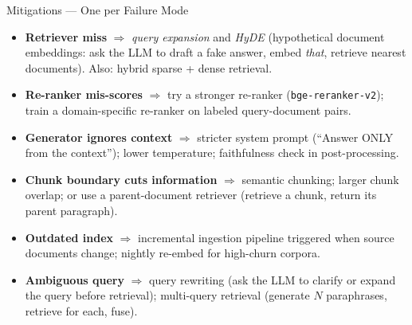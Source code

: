 \begin{frame}{Mitigations --- One per Failure Mode}
\begin{itemize}
\item \textbf{Retriever miss} $\Rightarrow$ \emph{query expansion} and \emph{HyDE} (hypothetical document embeddings: ask the LLM to draft a fake answer, embed \emph{that}, retrieve nearest documents). Also: hybrid sparse + dense retrieval.

\medskip
\item \textbf{Re-ranker mis-scores} $\Rightarrow$ try a stronger re-ranker (\texttt{bge-reranker-v2}); train a domain-specific re-ranker on labeled query-document pairs.

\medskip
\item \textbf{Generator ignores context} $\Rightarrow$ stricter system prompt (``Answer ONLY from the context''); lower temperature; faithfulness check in post-processing.

\medskip
\item \textbf{Chunk boundary cuts information} $\Rightarrow$ semantic chunking; larger chunk overlap; or use a parent-document retriever (retrieve a chunk, return its parent paragraph).

\medskip
\item \textbf{Outdated index} $\Rightarrow$ incremental ingestion pipeline triggered when source documents change; nightly re-embed for high-churn corpora.

\medskip
\item \textbf{Ambiguous query} $\Rightarrow$ query rewriting (ask the LLM to clarify or expand the query before retrieval); multi-query retrieval (generate $N$ paraphrases, retrieve for each, fuse).
\end{itemize}
\end{frame}

